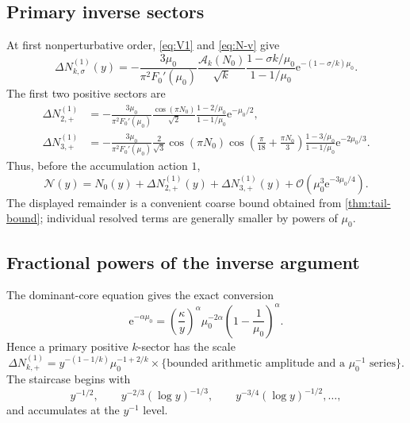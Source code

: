 \documentclass[11pt,a4paper]{article}
\numberwithin{equation}{section}
\theoremstyle{definition}
\theoremstyle{remark}
\newcommand{\e}{\mathrm e}
\newcommand{\bigO}{\mathcal O}
\newcommand{\Acal}{\mathcal A}
\newcommand{\Ncal}{\mathcal N}
\begin{document}
\subsection{Primary inverse sectors}

At first nonperturbative order, \eqref{eq:V1} and \eqref{eq:N-v} give
\begin{equation}\label{eq:Delta-primary}
 \boxed{
 \Delta N_{k,\sigma}^{(1)}(y)=
 -\frac{3\mu_0}{\pi^2F_0'(\mu_0)}
 \frac{\Acal_k(N_0)}{\sqrt{k}}
 \frac{1-\sigma k/\mu_0}{1-1/\mu_0}
 \e^{-(1-\sigma/k)\mu_0}.}
\end{equation}
The first two positive sectors are
\begin{align}
 \Delta N_{2,+}^{(1)}
 &=-\frac{3\mu_0}{\pi^2F_0'(\mu_0)}
 \frac{\cos(\pi N_0)}{\sqrt2}
 \frac{1-2/\mu_0}{1-1/\mu_0}\e^{-\mu_0/2},
 \label{eq:Delta2}\\
 \Delta N_{3,+}^{(1)}
 &=-\frac{3\mu_0}{\pi^2F_0'(\mu_0)}
 \frac{2}{\sqrt3}\cos(\pi N_0)
 \cos\!\left(\frac\pi{18}+\frac{\pi N_0}{3}\right)
 \frac{1-3/\mu_0}{1-1/\mu_0}\e^{-2\mu_0/3}.
 \label{eq:Delta3}
\end{align}
Thus, before the accumulation action $1$,
\begin{equation}\label{eq:first-two-inverse}
 \Ncal(y)=N_0(y)+\Delta N_{2,+}^{(1)}(y)
 +\Delta N_{3,+}^{(1)}(y)
 +\bigO\!\left(\mu_0^3\e^{-3\mu_0/4}\right).
\end{equation}
The displayed remainder is a convenient coarse bound obtained from
\cref{thm:tail-bound}; individual resolved terms are generally smaller by
powers of $\mu_0$.

\subsection{Fractional powers of the inverse argument}

The dominant-core equation gives the exact conversion
\begin{equation}\label{eq:exp-to-y}
 \e^{-\alpha\mu_0}=
 \left(\frac\kappa y\right)^\alpha
 \mu_0^{-2\alpha}
 \left(1-\frac1{\mu_0}\right)^\alpha.
\end{equation}
Hence a primary positive $k$-sector has the scale
\begin{equation}\label{eq:positive-y-scale}
 \Delta N_{k,+}^{(1)}
 =y^{-(1-1/k)}\mu_0^{-1+2/k}
 \times\{\text{bounded arithmetic amplitude and a }\mu_0^{-1}\text{ series}\}.
\end{equation}
The staircase begins with
\[
 y^{-1/2},\qquad y^{-2/3}(\log y)^{-1/3},\qquad
 y^{-3/4}(\log y)^{-1/2},\ldots,
\]
and accumulates at the $y^{-1}$ level.
\end{document}
